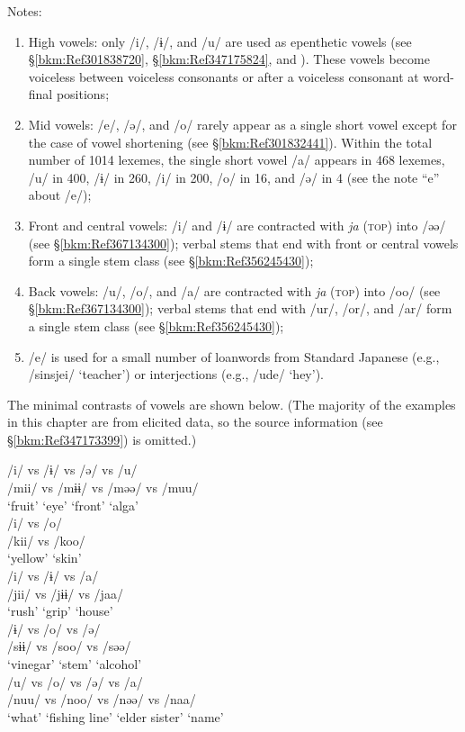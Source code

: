 Notes:
\begin{enumerate}[label=\alph*.]
\item High vowels: only /i/, /ɨ/, and /u/ are used as epenthetic vowels (see §\ref{bkm:Ref301838720}, §\ref{bkm:Ref347175824}, and ). These vowels become voiceless between voiceless consonants or after a voiceless consonant at word-final positions;
\item \label{bkm:Ref347176670}Mid vowels: /e/, /ə/, and /o/ rarely appear as a single short vowel except for the case of vowel shortening (see §\ref{bkm:Ref301832441}). Within the total number of 1014 lexemes, the single short vowel /a/ appears in 468 lexemes, /u/ in 400, /ɨ/ in 260, /i/ in 200, /o/ in 16, and /ə/ in 4 (see the note “e” about /e/);
\item Front and central vowels: /i/ and /ɨ/ are contracted with \textit{ja} (\textsc{top}) into /əə/ (see §\ref{bkm:Ref367134300}); verbal stems that end with front or central vowels form a single stem class (see §\ref{bkm:Ref356245430});
\item Back vowels: /u/, /o/, and /a/ are contracted with \textit{ja} (\textsc{top}) into /oo/ (see §\ref{bkm:Ref367134300}); verbal stems that end with /ur/, /or/, and /ar/ form a single stem class (see §\ref{bkm:Ref356245430});
\item /e/ is used for a small number of loanwords from Standard Japanese (e.g., /sinsjei/ ‘teacher’) or interjections (e.g., /ude/ ‘hey’).
\end{enumerate}

The minimal contrasts of vowels are shown below. (The majority of the examples in this chapter are from elicited data, so the source information (see §\ref{bkm:Ref347173399}) is omitted.)

\ea 
\ea /i/ vs /ɨ/ vs /ə/ vs /u/\\
 /mii/  vs  /mɨɨ/  vs  /məə/  vs  /muu/\\
 ‘fruit’ {} ‘eye’ {}  ‘front’ {}  ‘alga’\\
\ex /i/ vs /o/\\
/kii/  vs  /koo/\\
‘yellow’ {}  ‘skin’\\
\ex /i/ vs /ɨ/ vs /a/\\
/jii/  vs  /jɨɨ/  vs  /jaa/\\
‘rush’ {}  ‘grip’ {}  ‘house’\\
\ex /ɨ/ vs /o/ vs /ə/\\
/sɨɨ/  vs  /soo/  vs  /səə/\\
‘vinegar’ {}  ‘stem’ {}  ‘alcohol’\\
\ex /u/ vs /o/ vs /ə/ vs /a/\\
/nuu/  vs  /noo/  vs  /nəə/  vs  /naa/\\
‘what’ {}  ‘fishing line’ {}  ‘elder sister’ {}  ‘name’\\
\z
\z

